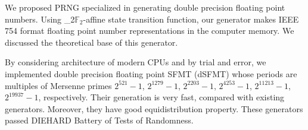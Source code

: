 \documentclass{svmult}
\def\bbf2{\ifmmode\mathbb{F}_2\else$\mathbb{F}_2$\fi}%
\begin{document}
We proposed PRNG specialized in generating double precision
floating point numbers. Using \bbf2-affine state transition
function, our generator makes IEEE 754 format floating point number
representations in the computer
memory. We discussed the theoretical base of this generator.

By considering architecture of modern CPUs and by trial and error, we
implemented double precision floating point SFMT (dSFMT) whose periods
are multiples of 
Mersenne primes $2^{521}-1$, $2^{1279}-1$, $2^{2203}-1$, $2^{4253}-1$, 
$2^{11213}-1$, $2^{19937}-1$, respectively.
Their generation is very fast, compared with existing generators.
Moreover, they have good equidistribution property.
These generators passed DIEHARD Battery of Tests of Randomness.\cite{diehard}


\end{document}
